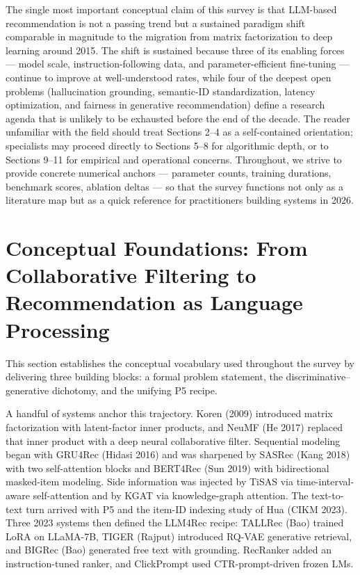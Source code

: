 \documentclass{article}
\begin{document}
The single most important conceptual claim of this survey is that LLM-based recommendation is not a passing trend but a sustained paradigm shift comparable in magnitude to the migration from matrix factorization to deep learning around 2015. The shift is sustained because three of its enabling forces --- model scale, instruction-following data, and parameter-efficient fine-tuning --- continue to improve at well-understood rates, while four of the deepest open problems (hallucination grounding, semantic-ID standardization, latency optimization, and fairness in generative recommendation) define a research agenda that is unlikely to be exhausted before the end of the decade. The reader unfamiliar with the field should treat Sections 2--4 as a self-contained orientation; specialists may proceed directly to Sections 5--8 for algorithmic depth, or to Sections 9--11 for empirical and operational concerns. Throughout, we strive to provide concrete numerical anchors --- parameter counts, training durations, benchmark scores, ablation deltas --- so that the survey functions not only as a literature map but as a quick reference for practitioners building systems in 2026.

\section{Conceptual Foundations: From Collaborative Filtering to Recommendation as Language Processing}\label{conceptual-foundations-from-collaborative-filtering-to-recommendation-as-language-processing}

This section establishes the conceptual vocabulary used throughout the survey by delivering three building blocks: a formal problem statement, the discriminative--generative dichotomy, and the unifying P5 recipe.

A handful of systems anchor this trajectory. Koren (2009) introduced matrix factorization with latent-factor inner products, and NeuMF (He 2017) replaced that inner product with a deep neural collaborative filter. Sequential modeling began with GRU4Rec (Hidasi 2016) and was sharpened by SASRec (Kang 2018) with two self-attention blocks and BERT4Rec (Sun 2019) with bidirectional masked-item modeling. Side information was injected by TiSAS \citep{li2020wsdm2020} via time-interval-aware self-attention and by KGAT \citep{wang2018www2018} via knowledge-graph attention. The text-to-text turn arrived with P5 \citep{geng2022recsys2022} and the item-ID indexing study of Hua (CIKM 2023). Three 2023 systems then defined the LLM4Rec recipe: TALLRec (Bao) trained LoRA on LLaMA-7B, TIGER (Rajput) introduced RQ-VAE generative retrieval, and BIGRec (Bao) generated free text with grounding. RecRanker \citep{luo2024recrankerinstructi} added an instruction-tuned ranker, and ClickPrompt \citep{lin2023clickpromptctrmode} used CTR-prompt-driven frozen LMs.
\end{document}
